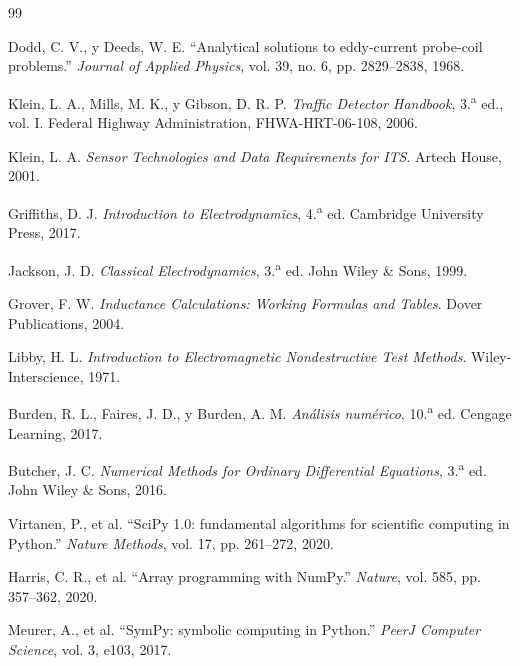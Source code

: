 \documentclass[10pt,onecolumn]{article}
\numberwithin{equation}{section}
\numberwithin{figure}{section}
\numberwithin{table}{section}
\begin{document}
\begingroup
\renewcommand{\section}[2]{}
\begin{thebibliography}{99}

Dodd, C. V., y Deeds, W. E.
``Analytical solutions to eddy-current probe-coil problems.''
\textit{Journal of Applied Physics}, vol. 39, no. 6, pp. 2829--2838, 1968.

Klein, L. A., Mills, M. K., y Gibson, D. R. P.
\textit{Traffic Detector Handbook}, 3.\textsuperscript{a} ed., vol. I.
Federal Highway Administration, FHWA-HRT-06-108, 2006.

Klein, L. A.
\textit{Sensor Technologies and Data Requirements for ITS}.
Artech House, 2001.

Griffiths, D. J.
\textit{Introduction to Electrodynamics}, 4.\textsuperscript{a} ed.
Cambridge University Press, 2017.

Jackson, J. D.
\textit{Classical Electrodynamics}, 3.\textsuperscript{a} ed.
John Wiley \& Sons, 1999.

Grover, F. W.
\textit{Inductance Calculations: Working Formulas and Tables}.
Dover Publications, 2004.

Libby, H. L.
\textit{Introduction to Electromagnetic Nondestructive Test Methods}.
Wiley-Interscience, 1971.

Burden, R. L., Faires, J. D., y Burden, A. M.
\textit{Análisis numérico}, 10.\textsuperscript{a} ed.
Cengage Learning, 2017.

Butcher, J. C.
\textit{Numerical Methods for Ordinary Differential Equations}, 3.\textsuperscript{a} ed.
John Wiley \& Sons, 2016.

Virtanen, P., et al.
``SciPy 1.0: fundamental algorithms for scientific computing in Python.''
\textit{Nature Methods}, vol. 17, pp. 261--272, 2020.

Harris, C. R., et al.
``Array programming with NumPy.''
\textit{Nature}, vol. 585, pp. 357--362, 2020.

Meurer, A., et al.
``SymPy: symbolic computing in Python.''
\textit{PeerJ Computer Science}, vol. 3, e103, 2017.


\end{thebibliography}
\end{document}
